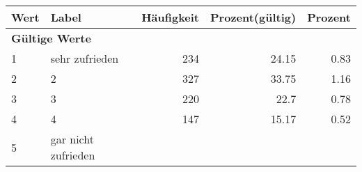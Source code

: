      \begin{longtable}{lXrrr}
     \toprule
     \textbf{Wert} & \textbf{Label} & \textbf{Häufigkeit} & \textbf{Prozent(gültig)} & \textbf{Prozent} \\
     \endhead
     \midrule
     \multicolumn{5}{l}{\textbf{Gültige Werte}}\\

     1 &
     \multicolumn{1}{X}{ sehr zufrieden   } &


       \num{234} &
       \num[round-mode=places,round-precision=2]{24.15} &
         \num[round-mode=places,round-precision=2]{0.83} \\

     2 &
     \multicolumn{1}{X}{ 2   } &


       \num{327} &
       \num[round-mode=places,round-precision=2]{33.75} &
         \num[round-mode=places,round-precision=2]{1.16} \\

     3 &
     \multicolumn{1}{X}{ 3   } &


       \num{220} &
       \num[round-mode=places,round-precision=2]{22.7} &
         \num[round-mode=places,round-precision=2]{0.78} \\

     4 &
     \multicolumn{1}{X}{ 4   } &


       \num{147} &
       \num[round-mode=places,round-precision=2]{15.17} &
         \num[round-mode=places,round-precision=2]{0.52} \\

     5 &
     \multicolumn{1}{X}{ gar nicht zufrieden   } &



\end{longtable}
